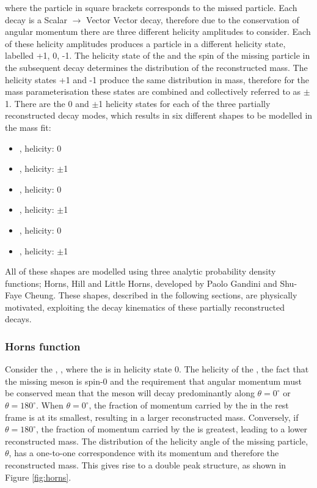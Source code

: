 where the particle in square brackets corresponds to the missed particle. Each \decay{\B}{\Dstar\Kstar} decay is a Scalar $\to$ Vector Vector decay, therefore due to the conservation of angular momentum there are three different helicity amplitudes to consider. Each of these helicity amplitudes produces a \Dstar particle in a different helicity state, labelled +1, 0, -1. The helicity state of the \Dstar and the spin of the missing particle in the subsequent \Dstar decay determines the distribution of the reconstructed \B mass. The helicity states +1 and -1 produce the same distribution in \Bm mass, therefore for the mass parameterisation these states are combined and collectively referred to as $\pm$1. There are the 0 and $\pm$1 \Dstar helicity states for each of the three partially reconstructed decay modes, which results in six different shapes to be modelled in the mass fit:
\begin{itemize}
\item{\decay{\Bm}{(\decay{\Dstarz}{\Dz[\piz]})\Kstarm}, \Dstarz helicity: 0} 
\item{\decay{\Bm}{(\decay{\Dstarz}{\Dz[\piz]})\Kstarm}, \Dstarz helicity: $\pm$1} 
\item{\decay{\Bm}{(\decay{\Dstarz}{\Dz[\gamma]})\Kstarm}, \Dstarz helicity: 0}
\item{\decay{\Bm}{(\decay{\Dstarz}{\Dz[\gamma]})\Kstarm}, \Dstarz helicity: $\pm$1}
\item{\decay{\Bd}{(\decay{\Dstarp}{\Dz[\pip]})\Kstarm}, \Dstarp helicity: 0}
\item{\decay{\Bd}{(\decay{\Dstarp}{\Dz[\pip]})\Kstarm}, \Dstarp helicity: $\pm$1}
\end{itemize}
All of these shapes are modelled using three analytic probability density functions; Horns, Hill and Little Horns, developed by Paolo Gandini and Shu-Faye Cheung. These shapes, described in the following sections, are physically motivated, exploiting the decay kinematics of these partially reconstructed decays.

\subsubsection{Horns function}

Consider the \decay{\Bm}{\Dstarz\Kstarm}, \decay{\Dstarz}{\Dz\piz}, where the \Dstarz is in helicity state 0. The helicity of the \Dstarz, the fact that the missing \piz meson is spin-0 and the requirement that angular momentum must be conserved mean that the \piz meson will decay predominantly along $\theta = 0^{\circ}$ or $\theta = 180^{\circ}$. When $\theta = 0^{\circ}$, the fraction of momentum carried by the \piz in the \Bm rest frame is at its smallest, resulting in a larger reconstructed \Bm mass. Conversely, if $\theta = 180^{\circ}$, the fraction of momentum carried by the \piz is greatest, leading to a lower reconstructed \Bm mass. The distribution of the helicity angle of the missing particle, $\theta$, has a one-to-one correspondence with its momentum and therefore the reconstructed \Bm mass. This gives rise to a double peak structure, as shown in Figure \ref{fig:horns}.

